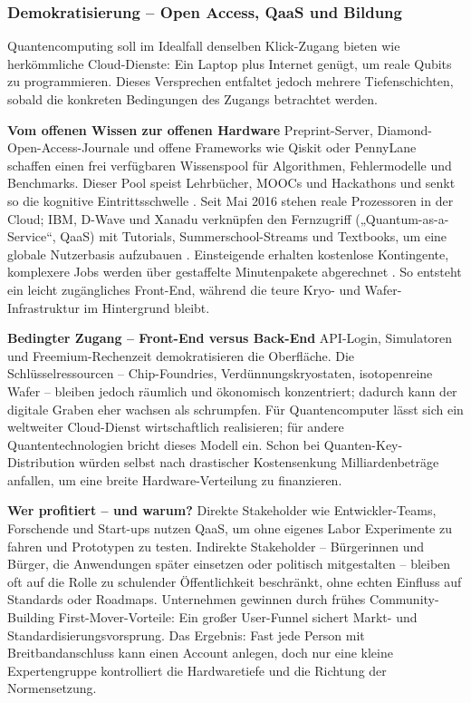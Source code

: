 \subsubsection{Demokratisierung – Open Access, QaaS und Bildung}
Quantencomputing soll im Idealfall denselben Klick-Zugang bieten wie herkömmliche Cloud-Dienste: Ein Laptop plus Internet genügt, um reale Qubits zu programmieren. Dieses Versprechen entfaltet jedoch mehrere Tiefenschichten, sobald die konkreten Bedingungen des Zugangs betrachtet werden.

\textbf{Vom offenen Wissen zur offenen Hardware}
Preprint-Server, Diamond-Open-Access-Journale und offene Frameworks wie Qiskit oder PennyLane schaffen einen frei verfügbaren Wissenspool für Algorithmen, Fehlermodelle und Benchmarks. Dieser Pool speist Lehrbücher, MOOCs und Hackathons und senkt so die kognitive Eintrittsschwelle .
Seit Mai 2016 stehen reale Prozessoren in der Cloud; IBM, D-Wave und Xanadu verknüpfen den Fernzugriff („Quantum-as-a-Service“, QaaS) mit Tutorials, Summerschool-Streams und Textbooks, um eine globale Nutzerbasis aufzubauen . Einsteigende erhalten kostenlose Kontingente, komplexere Jobs werden über gestaffelte Minutenpakete abgerechnet . So entsteht ein leicht zugängliches Front-End, während die teure Kryo- und Wafer-Infrastruktur im Hintergrund bleibt.\cite{seskirDemocratizationQuantumTechnologies2022}

\textbf{Bedingter Zugang – Front-End versus Back-End}
API-Login, Simulatoren und Freemium-Rechenzeit demokratisieren die Oberfläche. Die Schlüsselressourcen – Chip-Foundries, Verdünnungskryostaten, isotopenreine Wafer – bleiben jedoch räumlich und ökonomisch konzentriert; dadurch kann der digitale Graben eher wachsen als schrumpfen.
Für Quantencomputer lässt sich ein weltweiter Cloud-Dienst wirtschaftlich realisieren; für andere Quantentechnologien bricht dieses Modell ein. Schon bei Quanten-Key-Distribution würden selbst nach drastischer Kostensenkung Milliardenbeträge anfallen, um eine breite Hardware-Verteilung zu finanzieren.\cite{seskirDemocratizationQuantumTechnologies2022}

\textbf{Wer profitiert – und warum?}
Direkte Stakeholder wie Entwickler-Teams, Forschende und Start-ups nutzen QaaS, um ohne eigenes Labor Experimente zu fahren und Prototypen zu testen.
Indirekte Stakeholder – Bürgerinnen und Bürger, die Anwendungen später einsetzen oder politisch mitgestalten – bleiben oft auf die Rolle zu schulender Öffentlichkeit beschränkt, ohne echten Einfluss auf Standards oder Roadmaps.
Unternehmen gewinnen durch frühes Community-Building First-Mover-Vorteile: Ein großer User-Funnel sichert Markt- und Standardisierungsvorsprung.
Das Ergebnis: Fast jede Person mit Breitbandanschluss kann einen Account anlegen, doch nur eine kleine Expertengruppe kontrolliert die Hardwaretiefe und die Richtung der Normensetzung.\cite{seskirDemocratizationQuantumTechnologies2022}

